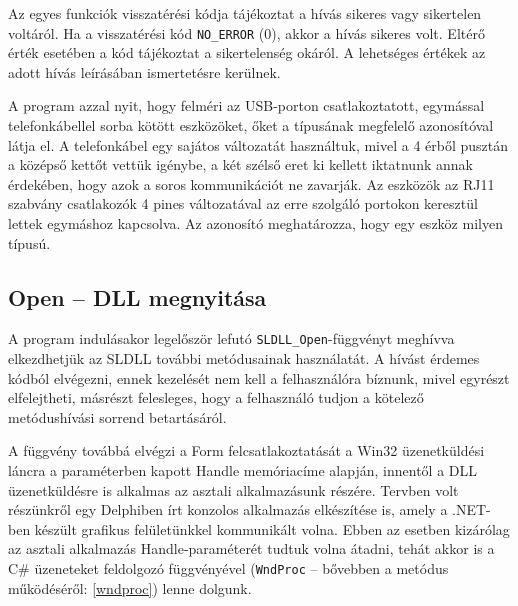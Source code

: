 \documentclass[tocnopagenum]{thesis-ekf}
\theoremstyle{definition}
\theoremstyle{remark}
\begin{document}
	Az egyes funkciók visszatérési kódja tájékoztat a hívás sikeres vagy            
	sikertelen voltáról. Ha a visszatérési kód \verb*|NO_ERROR| (0), akkor a hívás sikeres volt. Eltérő érték esetében a kód tájékoztat a sikertelenség okáról. A lehetséges értékek az adott hívás leírásában ismertetésre kerülnek.  
	
	A program azzal nyit, hogy felméri az USB-porton csatlakoztatott, egymással telefonkábellel sorba kötött eszközöket, őket a típusának megfelelő azonosítóval látja el. A telefonkábel egy sajátos változatát használtuk, mivel a 4 érből pusztán a középső kettőt vettük igénybe, a két szélső eret ki kellett iktatnunk annak érdekében, hogy azok a soros kommunikációt ne zavarják. Az eszközök az RJ11 szabvány csatlakozók 4 pines változatával az erre szolgáló portokon keresztül lettek egymáshoz kapcsolva. Az azonosító meghatározza, hogy egy eszköz milyen típusú. 
	
	\subsection{Open -- DLL megnyitása}
	A program indulásakor legelőször lefutó \verb*|SLDLL_Open|-függvényt meghívva elkezdhetjük az SLDLL további metódusainak használatát. A hívást érdemes kódból elvégezni, ennek kezelését nem kell a felhasználóra bíznunk, mivel egyrészt elfelejtheti, másrészt felesleges, hogy a felhasználó tudjon a kötelező metódushívási sorrend betartásáról. 
	
	A függvény továbbá elvégzi a Form felcsatlakoztatását a Win32 üzenetküldési láncra a paraméterben kapott Handle memóriacíme alapján, innentől a DLL üzenetküldésre is alkalmas az asztali alkalmazásunk részére. Tervben volt részünkről egy Delphiben írt konzolos alkalmazás elkészítése is, amely a .NET-ben készült grafikus felületünkkel kommunikált volna. Ebben az esetben kizárólag az asztali alkalmazás Handle-paraméterét tudtuk volna átadni, tehát akkor is a C\# üzeneteket feldolgozó függvényével (\verb*|WndProc| -- bővebben a metódus működéséről: \ref{wndproc}) lenne dolgunk.
	
\end{document}
